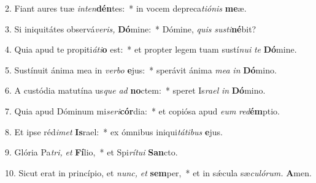 \item 2. Fiant aures tuæ \textit{inten}\textbf{dén}tes:~* in vocem depreca\hspace{0.03em}\textit{tiónis} \textbf{me}æ.
\item 3. Si iniquitátes observá\hspace{0.03em}\textit{veris,} \textbf{Dó}mine:~* Dómine, \textit{quis} \textit{susti}\textbf{né}bit?
\item 4. Quia apud te propiti\hspace{0.03em}\textit{áti}\textbf{o} est:~* et propter legem tuam sustí\textit{nui} \textit{te} \textbf{Dó}mine.
\item 5. Sustínuit ánima mea in \textit{verbo} \textbf{e}jus:~* sperávit ánima \textit{mea} \textit{in} \textbf{Dó}mino.
\item 6. A custódia matutína us\hspace{0.03em}\textit{que} \textit{ad} \textbf{no}ctem:~* speret Is\hspace{0.03em}\textit{rael} \textit{in} \textbf{Dó}mino.
\item 7. Quia apud Dóminum mi\hspace{0.03em}\textit{seri}\textbf{cór}dia:~* et copiósa apud \textit{eum} \textit{red}\textbf{ém}ptio.
\item 8. Et ipse réd\hspace{0.03em}\textit{imet} \textbf{Is}rael:~* ex ómnibus iniqui\hspace{0.03em}\textit{tátibus} \textbf{e}jus.
\item 9. Glória Pa\hspace{0.03em}\textit{tri,} \textit{et} \textbf{Fí}lio,~* et Spi\hspace{0.03em}\textit{rítui} \textbf{San}cto.
\item 10. Sicut erat in princípio, et \textit{nunc,} \textit{et} \textbf{sem}per,~* et in sǽcula sæ\hspace{0.03em}\textit{culórum.} \textbf{A}men.
